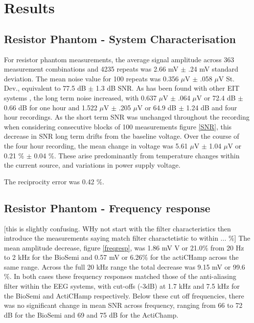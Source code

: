 \section{Results}
\subsection{Resistor Phantom - System Characterisation}
For resistor phantom measurements, the average signal amplitude across 363 measurement combinations and 4235 repeats was 2.66 mV $\pm$ .24 mV standard deviation. The mean noise value for 100 repeats was 0.356 $\mu$V $\pm$ .058 $\mu$V St. Dev., equivalent to 77.5 dB $\pm$ 1.3 dB SNR. As has been found with other EIT systems \cite{oh2007multi}, the long term noise increased, with 0.637 $\mu$V $\pm$ .064 $\mu$V or 72.4 dB $\pm$ 0.66 dB for one hour and 1.522 $\mu$V $\pm$ .205 $\mu$V or 64.9 dB $\pm$ 1.24 dB and four hour recordings. As the short term SNR was unchanged throughout the recording when considering consecutive blocks of 100 measurements figure \ref{SNR}, this decrease in SNR 
long term drifts from the baseline voltage. Over the course of the four hour recording, the mean change in voltage was 5.61 $\mu$V $\pm$ 1.04 $\mu$V or 0.21 \% $\pm$ 0.04 \%. 
These arise predominantly from temperature changes within the current source, and variations in power supply voltage.

The reciprocity error was 0.42 \%. 



\subsection{Resistor Phantom - Frequency response}
[this is slightly confusing. WHy not start with the filter characteristics then introduce the measurements saying match filter charactetistic to within ... \%] The mean amplitude decrease, figure \ref{freqresp}, was 1.86 mV V or 21.0\%  from 20 Hz to 2 kHz for the BioSemi and 0.57 mV or 6.26\% for the actiCHamp across the same range. Across the full 20 kHz range the total decrease was 9.15 mV or  99.6 \%.  In both cases these frequency responses matched those of the anti-aliasing filter within the EEG systems, with cut-offs (-3dB) at 1.7 kHz and 7.5 kHz for the BioSemi and ActiCHamp respectively. Below these cut off frequencies, there was no significant change in mean SNR across frequency, ranging from 66 to 72 dB for the BioSemi and 69 and 75 dB for the ActiChamp.  